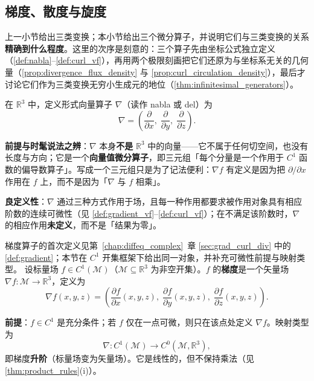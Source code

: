 \subsection{梯度、散度与旋度}\label{subsec:grad_div_curl}

上一小节给出三类变换；本小节给出三个微分算子，并说明它们与三类变换的关系\textbf{精确到什么程度}。这里的次序是刻意的：三个算子先由坐标公式独立定义（\cref{def:nabla}--\cref{def:curl_vf}），再用两个极限刻画把它们还原为与坐标系无关的几何量（\cref{prop:divergence_flux_density} 与 \cref{prop:curl_circulation_density}），最后才讨论它们作为三类变换无穷小生成元的地位（\cref{thm:infinitesimal_generators}）。

\begin{definition}[Nabla 算子]\label{def:nabla}
在 $\mathbb{R}^3$ 中，定义形式向量算子 $\nabla$（读作 nabla 或 del）为
\[
\nabla = \left( \frac{\partial}{\partial x},\; \frac{\partial}{\partial y},\; \frac{\partial}{\partial z} \right).
\]

\textbf{前提与时髦说法之辨}：$\nabla$ 本身\textbf{不是} $\mathbb R^3$ 中的向量——它不属于任何切空间，也没有长度与方向；它是一个\textbf{向量值微分算子}，即三元组「每个分量是一个作用于 $C^1$ 函数的偏导数算子」。写成一个三元组只是为了记法便利：$\nabla f$ 有定义是因为把 $\partial/\partial x$ 作用在 $f$ 上，而不是因为「$\nabla$ 与 $f$ 相乘」。

\textbf{良定义性}：$\nabla$ 通过三种方式作用于场，且每一种作用都要求被作用对象具有相应阶数的连续可微性（见 \cref{def:gradient_vf}--\cref{def:curl_vf}）；在不满足该阶数时，$\nabla$ 的相应作用\textbf{未定义}，而不是「结果为零」。
\end{definition}

\begin{definition}[梯度]\label{def:gradient_vf}
梯度算子的首次定义见第~\ref{chap:diffeq_complex}~章 \cref{sec:grad_curl_div} 中的 \cref{def:gradient}；本节在 $C^1$ 开集框架下给出同一对象，并补充可微性前提与映射类型。
设标量场 $f \in C^1(\mathcal{M})$（$\mathcal M\subseteq\mathbb R^3$ 为非空开集）。$f$ 的\textbf{梯度}是一个矢量场 $\nabla f: \mathcal{M} \to \mathbb{R}^3$，定义为
\[
\nabla f(x,y,z) = \left( \frac{\partial f}{\partial x}(x,y,z),\; \frac{\partial f}{\partial y}(x,y,z),\; \frac{\partial f}{\partial z}(x,y,z) \right).
\]

\textbf{前提}：$f\in C^1$ 是充分条件；若 $f$ 仅在一点可微，则只在该点处定义 $\nabla f$。映射类型为
\[
\nabla: C^1(\mathcal{M}) \to C^0(\mathcal{M}, \mathbb{R}^3),
\]
即梯度\textbf{升阶}（标量场变为矢量场）。它是线性的，但不保持乘法（见 \cref{thm:product_rules}(i)）。
\end{definition}

